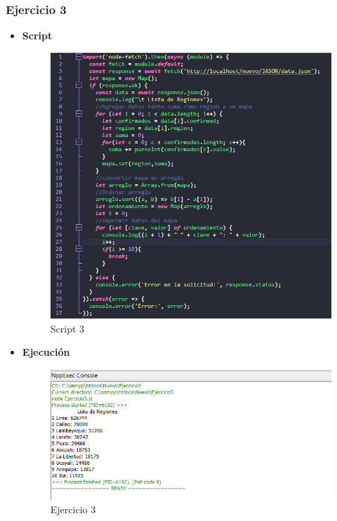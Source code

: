 \documentclass{article}
\begin{document}
    \subsubsection{Ejercicio 3}
	\begin{itemize}
		\item \textbf{Script}
		\begin{figure}[H]
			\centering
			\includegraphics[width=1\textwidth,keepaspectratio]{img/Script3.png}
			\caption{Script 3}
		\end{figure}
		\newpage
		\item \textbf{Ejecución}
		\begin{figure}[H]
			\centering
			\includegraphics[width=1\textwidth,keepaspectratio]{img/Ejecucion3.png}
			\caption{Ejercicio 3}
		\end{figure}
	\end{itemize}
\end{document}

